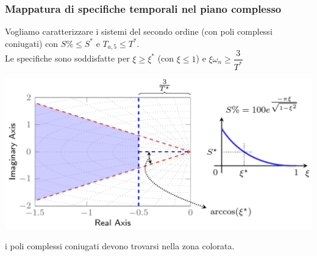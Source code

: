 \documentclass{article}
\numberwithin{equation}{subsection}
\begin{document}
\subsubsection{Mappatura di specifiche temporali nel piano complesso}
Vogliamo caratterizzare i sistemi del secondo ordine (con poli complessi coniugati) con $S\% \leq S^*$ e $T_{a,5} \leq T^*$. 
\vspace*{0.1cm}\\
Le specifiche sono soddisfatte per $\xi \geq \xi^*$ (con $\xi \leq 1$) e $\xi \omega_n \geq \dfrac{3}{T^*}$ 
\begin{center}
    \includegraphics[scale=0.23]{Images/Specifiche_temporali.png}
\end{center}
i poli complessi coniugati devono trovarsi nella zona colorata.
\end{document}
